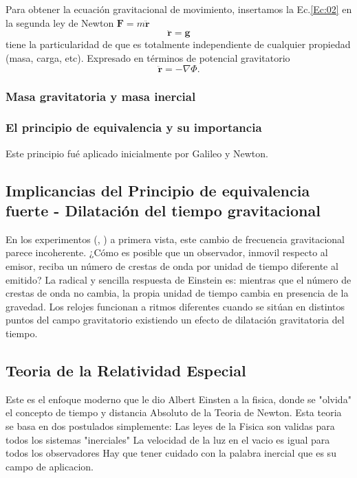 \documentclass[12pt,twoside]{rif}
\begin{document}
			Para obtener la ecuación gravitacional de movimiento, insertamos la Ec.\ref*{Ec:02} en la segunda ley de Newton $\mathbf{F}=m\mathbf{\ddot{r}}$
			\begin{equation}
				\mathbf{\ddot{r}}
				=
				\mathbf{g}
				\label{Ec:08}
			\end{equation}
			tiene la particularidad de que es totalmente independiente de cualquier propiedad (masa, carga, etc). Expresado en términos de potencial gravitatorio 
			\begin{equation}
				\mathbf{\ddot{r}}
				=
				- \nabla \Phi.
			\end{equation}


			\subsubsection{Masa gravitatoria y masa inercial}
			
			\subsubsection{El principio de equivalencia y su importancia}

				Este principio fué aplicado inicialmente por Galileo y Newton.

			\subsection{Implicancias del Principio de equivalencia fuerte - Dilatación del tiempo gravitacional}
			En los experimentos (\citet*{PoundRebka1960}, \citet*{PoundSnider1964}) a primera vista, este cambio de frecuencia gravitacional parece incoherente. ¿Cómo es posible que un observador, inmovil respecto al emisor, reciba un número de crestas de onda por unidad de tiempo diferente al emitido? La radical y sencilla respuesta de Einstein es: mientras que el número de crestas de onda no cambia, la propia unidad de tiempo cambia en presencia de la gravedad. Los relojes funcionan a ritmos diferentes cuando se sitúan en distintos puntos del campo gravitatorio existiendo un efecto de dilatación gravitatoria del tiempo.

	\subsection{Teoria de la Relatividad Especial}
	Este es el enfoque moderno que le dio Albert Einsten a la fisica, donde se "olvida" el concepto de tiempo y distancia Absoluto de la Teoria de Newton.
	Esta teoria se basa en dos postulados simplemente:
	Las leyes de la Fisica son validas para todos los sistemas "inerciales"
	 La velocidad de la luz en el vacio es igual para todos los observadores 
	Hay que tener cuidado con la palabra inercial que es su campo de aplicacion.
\end{document}
